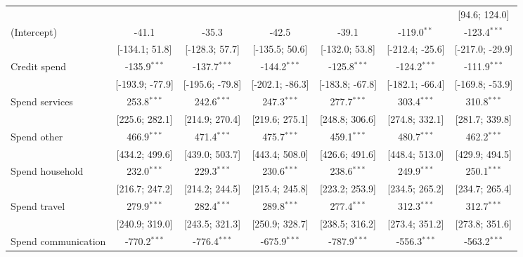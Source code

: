 \begin{table}[htbp]
\begin{threeparttable}[b]
\begin{tabular}{lcccccc}
                                   &                  &                  &                  &                  &                  & [94.6; 124.0]\\   
         (Intercept)               & -41.1            & -35.3            & -42.5            & -39.1            & -119.0$^{**}$    & -123.4$^{***}$\\   
                                   & [-134.1; 51.8]   & [-128.3; 57.7]   & [-135.5; 50.6]   & [-132.0; 53.8]   & [-212.4; -25.6]  & [-217.0; -29.9]\\   
         Credit spend              & -135.9$^{***}$   & -137.7$^{***}$   & -144.2$^{***}$   & -125.8$^{***}$   & -124.2$^{***}$   & -111.9$^{***}$\\   
                                   & [-193.9; -77.9]  & [-195.6; -79.8]  & [-202.1; -86.3]  & [-183.8; -67.8]  & [-182.1; -66.4]  & [-169.8; -53.9]\\   
         Spend services            & 253.8$^{***}$    & 242.6$^{***}$    & 247.3$^{***}$    & 277.7$^{***}$    & 303.4$^{***}$    & 310.8$^{***}$\\   
                                   & [225.6; 282.1]   & [214.9; 270.4]   & [219.6; 275.1]   & [248.8; 306.6]   & [274.8; 332.1]   & [281.7; 339.8]\\   
         Spend other               & 466.9$^{***}$    & 471.4$^{***}$    & 475.7$^{***}$    & 459.1$^{***}$    & 480.7$^{***}$    & 462.2$^{***}$\\   
                                   & [434.2; 499.6]   & [439.0; 503.7]   & [443.4; 508.0]   & [426.6; 491.6]   & [448.4; 513.0]   & [429.9; 494.5]\\   
         Spend household           & 232.0$^{***}$    & 229.3$^{***}$    & 230.6$^{***}$    & 238.6$^{***}$    & 249.9$^{***}$    & 250.1$^{***}$\\   
                                   & [216.7; 247.2]   & [214.2; 244.5]   & [215.4; 245.8]   & [223.2; 253.9]   & [234.5; 265.2]   & [234.7; 265.4]\\   
         Spend travel              & 279.9$^{***}$    & 282.4$^{***}$    & 289.8$^{***}$    & 277.4$^{***}$    & 312.3$^{***}$    & 312.7$^{***}$\\   
                                   & [240.9; 319.0]   & [243.5; 321.3]   & [250.9; 328.7]   & [238.5; 316.2]   & [273.4; 351.2]   & [273.8; 351.6]\\   
         Spend communication       & -770.2$^{***}$   & -776.4$^{***}$   & -675.9$^{***}$   & -787.9$^{***}$   & -556.3$^{***}$   & -563.2$^{***}$\\   

\end{tabular}
\end{threeparttable}
\end{table}
